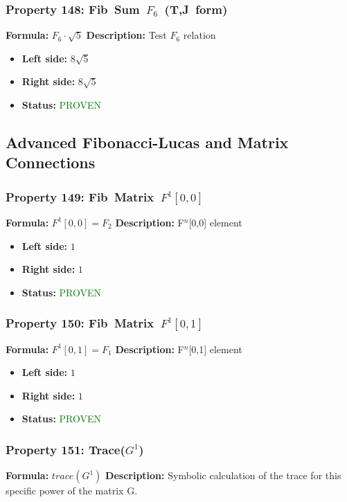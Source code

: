 \subsubsection*{Property 148: Fib~Sum~$F_{6}$~(T,J~form)}
\textbf{Formula:} $F_6 \cdot \sqrt{5}$
\textbf{Description:} Test $F_{6}$ relation

\begin{itemize}
\item \textbf{Left side:} $8 \sqrt{5}$
\item \textbf{Right side:} $8 \sqrt{5}$
\item \textbf{Status:} \textcolor{green}{PROVEN}
\end{itemize}


\subsection{Advanced Fibonacci-Lucas and Matrix Connections}

\subsubsection*{Property 149: Fib~Matrix~$F^{1}$$[0,0]$}
\textbf{Formula:} $F^1[0,0] = F_2$
\textbf{Description:} F$^n$[0,0] element

\begin{itemize}
\item \textbf{Left side:} $1$
\item \textbf{Right side:} $1$
\item \textbf{Status:} \textcolor{green}{PROVEN}
\end{itemize}

\subsubsection*{Property 150: Fib~Matrix~$F^{1}$$[0,1]$}
\textbf{Formula:} $F^1[0,1] = F_1$
\textbf{Description:} F$^n$[0,1] element

\begin{itemize}
\item \textbf{Left side:} $1$
\item \textbf{Right side:} $1$
\item \textbf{Status:} \textcolor{green}{PROVEN}
\end{itemize}

\subsubsection*{Property 151: Trace($G^{1}$)}
\textbf{Formula:} $trace(G^1)$
\textbf{Description:} Symbolic calculation of the trace for this specific power of the matrix G.

